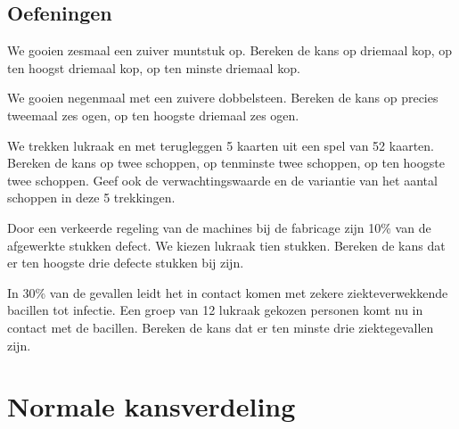 \documentclass[12pt,twoside]{article}
\begin{document}
\subsection{Oefeningen}

\begin{oefening}
We gooien zesmaal een zuiver muntstuk op. Bereken de kans op driemaal kop, op ten hoogst driemaal kop, op ten minste driemaal kop.
\end{oefening}

\begin{oefening}
We gooien negenmaal met een zuivere dobbelsteen. Bereken de kans op precies tweemaal zes ogen, op ten hoogste driemaal zes ogen.
\end{oefening}

\begin{oefening}
We trekken lukraak en met terugleggen 5 kaarten uit een spel van 52 kaarten. Bereken de kans op twee schoppen, op tenminste twee schoppen, op ten hoogste twee schoppen. Geef ook de verwachtingswaarde en de variantie van het aantal schoppen in deze 5 trekkingen.
\end{oefening}

\begin{oefening}
Door een verkeerde regeling van de machines bij de fabricage zijn 10\% van de afgewerkte stukken defect. We kiezen lukraak tien stukken. Bereken de kans dat er ten hoogste drie defecte stukken bij zijn.
\end{oefening}

\begin{oefening}
In 30\% van de gevallen leidt het in contact komen met zekere ziekteverwekkende bacillen tot infectie. Een groep van 12 lukraak gekozen personen komt nu in contact met de bacillen. Bereken de kans dat er ten minste drie ziektegevallen zijn.
\end{oefening}


\pagebreak
\section{Normale kansverdeling}
\end{document}
